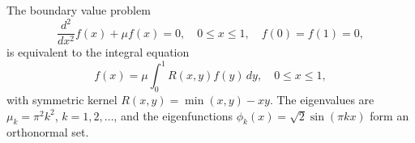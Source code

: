 The boundary value problem
\[
\frac{d^2}{dx^2}f(x) + \mu f(x) = 0, \quad 0 \leq x \leq 1, \quad f(0) = f(1) = 0,
\]
is equivalent to the integral equation
\[
f(x) = \mu \int_0^1 R(x,y) f(y) \, dy, \quad 0 \leq x \leq 1,
\]
with symmetric kernel \(R(x,y) = \min(x,y) - xy\). The eigenvalues are \(\mu_k = \pi^2 k^2\), \(k = 1,2,\dots\), and the eigenfunctions \(\phi_k(x) = \sqrt{2}\sin(\pi k x)\) form an orthonormal set.
